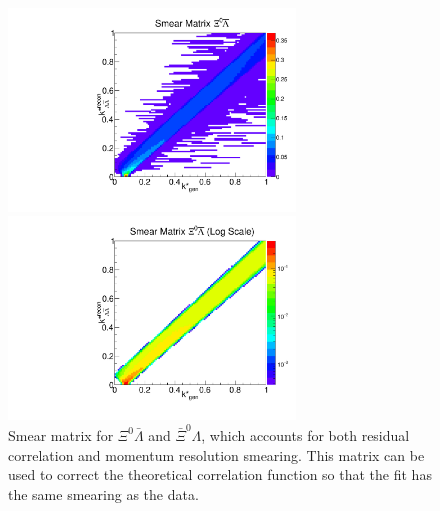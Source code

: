 \begin{figure}[h]
\begin{minipage}{18pc}
\includegraphics[width=18pc]{Figures/SmearMatrices/2016-7-19-SmearMatrixXi0LambdaNormLA.pdf}
\end{minipage}\hspace{2pc}
\begin{minipage}{18pc}
\includegraphics[width=18pc]{Figures/SmearMatrices/2016-7-19-SmearMatrixXi0LambdaNormLALog.pdf}
\end{minipage} 
\caption[Smear matrix -- $\Xi^0\bar{\Lambda}$ and $\bar{\Xi}^0\Lambda$]{
Smear matrix for $\Xi^0\bar{\Lambda}$ and $\bar{\Xi}^0\Lambda$, which accounts for both residual correlation and momentum resolution smearing. This matrix can be used to correct the theoretical correlation function so that the fit has the same smearing as the data.
}
\end{figure}

